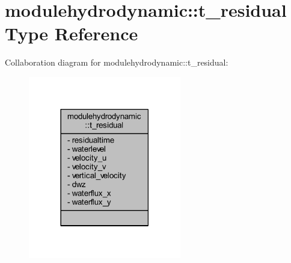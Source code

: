 \hypertarget{structmodulehydrodynamic_1_1t__residual}{}\section{modulehydrodynamic\+:\+:t\+\_\+residual Type Reference}
\label{structmodulehydrodynamic_1_1t__residual}


Collaboration diagram for modulehydrodynamic\+:\+:t\+\_\+residual\+:\nopagebreak
\begin{figure}[H]
\begin{center}
\leavevmode
\includegraphics[width=189pt]{structmodulehydrodynamic_1_1t__residual__coll__graph}
\end{center}
\end{figure}
